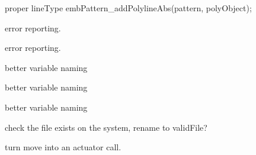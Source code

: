 \begin{DoxyRefList}
\label{todo__todo000019}%
%


\label{todo__todo000020}%
%
proper line\+Type emb\+Pattern\+\_\+add\+Polyline\+Abs(pattern, poly\+Object);  
\item[Member \mbox{\hyperlink{interface_8cpp_a0eca4d9adccf7ea7711afaaa4bfb2843}{set\+\_\+enabled}} (QObject $\ast$parent, const char $\ast$key, bool enabled)]\label{todo__todo000003}%
%
error reporting.  
\item[Member \mbox{\hyperlink{interface_8cpp_adc2edf17601102cd3f68307eb8fb93d9}{set\+\_\+visibility}} (QObject $\ast$parent, const char $\ast$key, bool visibility)]\label{todo__todo000004}%
%
error reporting.  
\item[Member \mbox{\hyperlink{structSubDescriptor___affb2c75b7f632338f368aafab49f678d}{Sub\+Descriptor\+\_\+\+::color\+Code}} ]\label{todo__todo000209}%
%
better variable naming  
\item[Member \mbox{\hyperlink{structSubDescriptor___a0cfe04519ff6dab092ee7c002e55e520}{Sub\+Descriptor\+\_\+\+::some\+Int}} ]\label{todo__todo000207}%
%
better variable naming  
\item[Member \mbox{\hyperlink{structSubDescriptor___a6154b0f4ec7815c6d26c71852506418e}{Sub\+Descriptor\+\_\+\+::some\+Other\+Int}} ]\label{todo__todo000208}%
%
better variable naming  
\item[Member \mbox{\hyperlink{mainwindow_8cpp_a8e199e892707e7dbbe2e5b44513253c8}{valid\+File\+Format}} (String file\+Name)]\label{todo__todo000009}%
%
check the file exists on the system, rename to valid\+File?  
\item[Member \mbox{\hyperlink{classView_ae820c6a86f0a1908bf451f86db043489}{View\+::mouse\+Move\+Event}} (QMouse\+Event $\ast$event)]\label{todo__todo000203}%
%
turn move into an actuator call. 
\end{DoxyRefList}